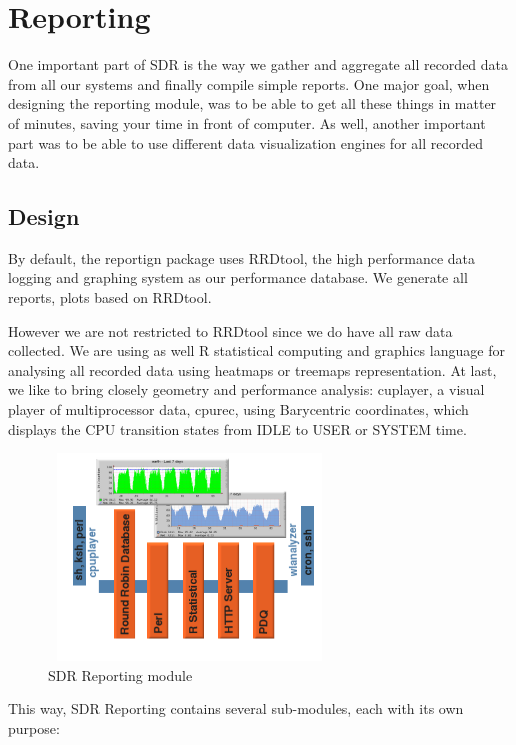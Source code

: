 \chapter{Reporting}

\noindent
One important part of SDR is the way we gather and aggregate all recorded data
from all our systems and finally compile simple reports. One major goal, when
designing the reporting module, was to be able to get all these things in
matter of minutes, saving your time in front of computer. As well, another 
important part was to be able to use different data visualization engines 
for all recorded data.

\section{Design}
By default, the reportign package uses RRDtool, the high performance data logging 
and graphing system as our performance database. We generate all reports, plots 
based on RRDtool.

However we are not restricted to RRDtool since we do have all raw data collected. 
We are using as well R statistical computing and graphics language for analysing 
all recorded data using heatmaps or treemaps representation. At last, we like 
to bring closely geometry and performance analysis: cuplayer, a visual player 
of multiprocessor data, cpurec, using Barycentric coordinates, which displays 
the CPU transition states from IDLE to USER or SYSTEM time.

\begin{figure}[!ht]
\centering
\includegraphics[width=75mm,height=55mm]{sdr-rep-schemaf.png}
\caption{SDR Reporting module}
\label{fig:sdr-rep-schemaf}
\end{figure}

This way, SDR Reporting contains several sub-modules, each with its own purpose:


